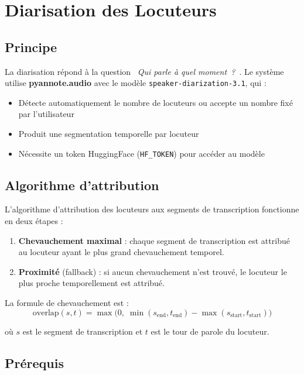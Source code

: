 \documentclass[12pt,a4paper]{report}
\begin{document}
\chapter{Diarisation des Locuteurs}

\section{Principe}

La diarisation répond à la question \og~\textit{Qui parle à quel moment~?}~\fg. Le système utilise \textbf{pyannote.audio} avec le modèle \texttt{speaker-diarization-3.1}, qui :

\begin{itemize}
    \item Détecte automatiquement le nombre de locuteurs ou accepte un nombre fixé par l'utilisateur
    \item Produit une segmentation temporelle par locuteur
    \item Nécessite un token HuggingFace (\texttt{HF\_TOKEN}) pour accéder au modèle
\end{itemize}

\section{Algorithme d'attribution}

L'algorithme d'attribution des locuteurs aux segments de transcription fonctionne en deux étapes :

\begin{enumerate}
    \item \textbf{Chevauchement maximal} : chaque segment de transcription est attribué au locuteur ayant le plus grand chevauchement temporel.
    \item \textbf{Proximité} (fallback) : si aucun chevauchement n'est trouvé, le locuteur le plus proche temporellement est attribué.
\end{enumerate}

La formule de chevauchement est :
\[
    \text{overlap}(s, t) = \max\!\Big(0,\;\min(s_{\text{end}}, t_{\text{end}}) - \max(s_{\text{start}}, t_{\text{start}})\Big)
\]

où $s$ est le segment de transcription et $t$ est le tour de parole du locuteur.

\section{Prérequis}
\end{document}
